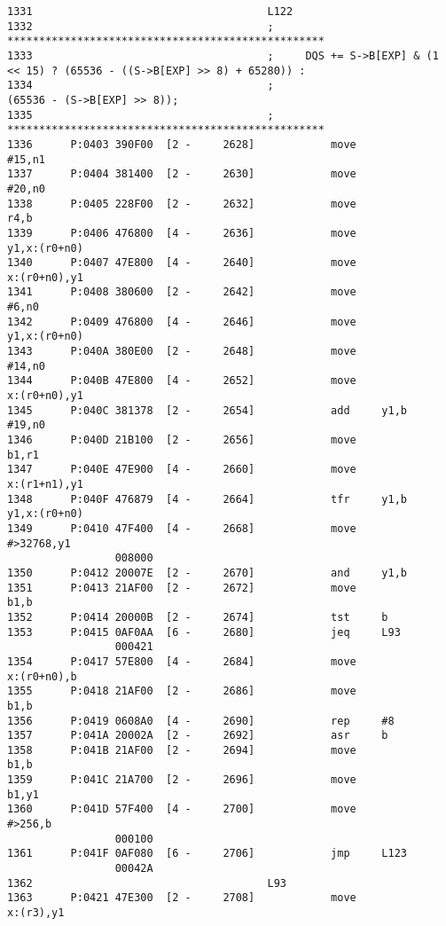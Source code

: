 {\begin{verbatim}
1331                                     L122
1332                                     ; **************************************************
1333                                     ;     DQS += S->B[EXP] & (1 << 15) ? (65536 - ((S->B[EXP] >> 8) + 65280)) :
1334                                     ;                                    (65536 - (S->B[EXP] >> 8));
1335                                     ; **************************************************
1336      P:0403 390F00  [2 -     2628]            move              #15,n1
1337      P:0404 381400  [2 -     2630]            move              #20,n0
1338      P:0405 228F00  [2 -     2632]            move              r4,b
1339      P:0406 476800  [4 -     2636]            move              y1,x:(r0+n0)
1340      P:0407 47E800  [4 -     2640]            move              x:(r0+n0),y1
1341      P:0408 380600  [2 -     2642]            move              #6,n0
1342      P:0409 476800  [4 -     2646]            move              y1,x:(r0+n0)
1343      P:040A 380E00  [2 -     2648]            move              #14,n0
1344      P:040B 47E800  [4 -     2652]            move              x:(r0+n0),y1
1345      P:040C 381378  [2 -     2654]            add     y1,b      #19,n0
1346      P:040D 21B100  [2 -     2656]            move              b1,r1
1347      P:040E 47E900  [4 -     2660]            move              x:(r1+n1),y1
1348      P:040F 476879  [4 -     2664]            tfr     y1,b      y1,x:(r0+n0)
1349      P:0410 47F400  [4 -     2668]            move              #>32768,y1
                 008000
1350      P:0412 20007E  [2 -     2670]            and     y1,b
1351      P:0413 21AF00  [2 -     2672]            move              b1,b
1352      P:0414 20000B  [2 -     2674]            tst     b
1353      P:0415 0AF0AA  [6 -     2680]            jeq     L93
                 000421
1354      P:0417 57E800  [4 -     2684]            move              x:(r0+n0),b
1355      P:0418 21AF00  [2 -     2686]            move              b1,b
1356      P:0419 0608A0  [4 -     2690]            rep     #8
1357      P:041A 20002A  [2 -     2692]            asr     b
1358      P:041B 21AF00  [2 -     2694]            move              b1,b
1359      P:041C 21A700  [2 -     2696]            move              b1,y1
1360      P:041D 57F400  [4 -     2700]            move              #>256,b
                 000100
1361      P:041F 0AF080  [6 -     2706]            jmp     L123
                 00042A
1362                                     L93
1363      P:0421 47E300  [2 -     2708]            move              x:(r3),y1

\end{verbatim}}
